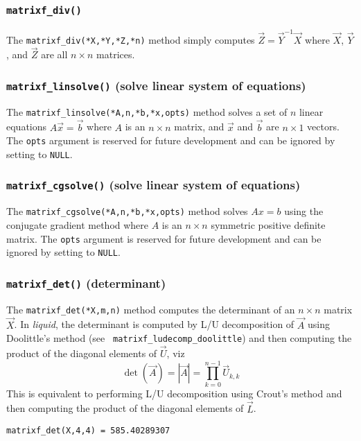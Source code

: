 \subsubsection{{\tt matrixf\_div()}}
\label{module:matrix:div}
The {\tt matrixf\_div(*X,*Y,*Z,*n)} method simply computes
$\vec{Z} = \vec{Y}^{-1}\vec{X}$
where $\vec{X}$, $\vec{Y}$, and $\vec{Z}$ are all $n \times n$ matrices.


\subsubsection{{\tt matrixf\_linsolve()} (solve linear system of equations)}
\label{module:matrix:linsolve}
The {\tt matrixf\_linsolve(*A,n,*b,*x,opts)} method solves a set of $n$ linear
equations $A\vec{x} = \vec{b}$
where
$A$ is an $n \times n$ matrix, and
$\vec{x}$ and $\vec{b}$ are $n \times 1$ vectors.
The {\tt opts} argument is reserved for future development and can be
ignored by setting to {\tt NULL}.

\subsubsection{{\tt matrixf\_cgsolve()} (solve linear system of equations)}
\label{module:matrix:cgsolve}
The {\tt matrixf\_cgsolve(*A,n,*b,*x,opts)} method solves $Ax = b$
using the conjugate gradient method
where $A$ is an $n \times n$ symmetric positive definite matrix.
The {\tt opts} argument is reserved for future development and can be
ignored by setting to {\tt NULL}.


\subsubsection{{\tt matrixf\_det()} (determinant)}
\label{module:matrix:det}
The {\tt matrixf\_det(*X,m,n)} method computes the determinant
of an $n \times n$ matrix $\vec{X}$.
In {\it liquid}, the determinant is computed by L/U decomposition of
$\vec{A}$ using Doolittle's method (see {\tt
matrixf\_ludecomp\_doolittle}) and then computing the product of the
diagonal elements of $\vec{U}$, viz
\[
    \det\left(\vec{A}\right) =
    \left|\vec{A}\right| =
    \prod_{k=0}^{n-1}{\vec{U}_{k,k}}
\]
This is equivalent to performing L/U decomposition using Crout's method and
then computing the product of the diagonal elements of $\vec{L}$.
%
\begin{Verbatim}[fontsize=\small]
    matrixf_det(X,4,4) = 585.40289307
\end{Verbatim}


